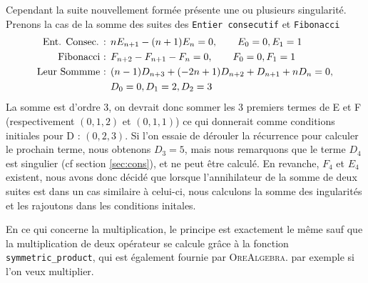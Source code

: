 \documentclass[12pt]{article}
\begin{document}
        \par Cependant la suite nouvellement formée présente une ou plusieurs singularité.
        Prenons la cas
        de la somme des suites des  \texttt{Entier consecutif} et \texttt{Fibonacci}
        \begin{align*}
            \textnormal{Ent. Consec. : } &nE_{n+1} - (n+1)E_n = 0,\qquad E_0 = 0, E_1 = 1\\
            \textnormal{Fibonacci : } &F_{n+2} - F_{n+1} - F_n = 0,\qquad F_0=0, F_1=1\\
            \textnormal{Leur Sommme : } &(n - 1)D_{n+3} + (-2n + 1)D_{n+2} + D_{n+1} + nD_n = 0, \\
            &D_0 = 0, D_1 = 2, D_2 = 3\\
        \end{align*} 
        La somme est d'ordre 3, on devrait donc sommer les 3 premiers termes de E et F (respectivement 
        $(0,1,2)$ et $(0,1,1)$) ce qui donnerait comme conditions initiales pour D : $(0,2,3)$.
        Si 
        l'on essaie de dérouler la récurrence pour calculer le prochain terme, nous obtenons $D_3 = 5$,
        mais nous remarquons que le terme $D_4$ est singulier (cf section \ref{sec:cons}), et ne peut 
        être calculé. En revanche, $F_4$ et $E_4$ existent, nous avons donc décidé que lorsque l'annihilateur
        de la somme de deux suites est dans un cas similaire à celui-ci, nous calculons la somme des
        ingularités et les rajoutons dans les conditions initales.
        \par En ce qui concerne la multiplication, le principe est exactement le même sauf que la 
        multiplication de deux opérateur se calcule grâce à la fonction \texttt{symmetric\_product},
        qui est également fournie par \textsc{OreAlgebra}.
        par exemple si l'on veux multiplier.\\
\end{document}
